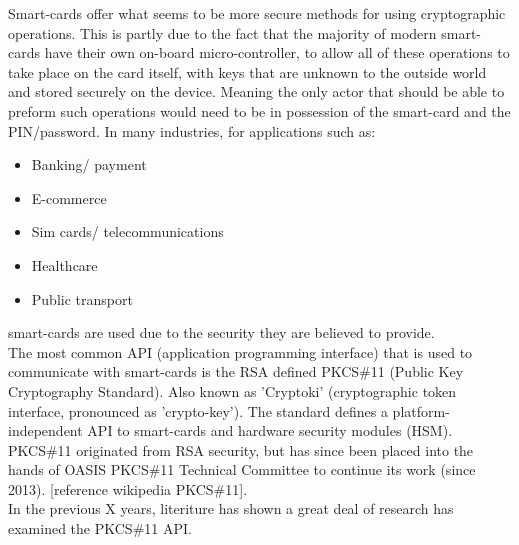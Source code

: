 \documentclass[a4paper]{report}
\begin{document}
\noindent Smart-cards offer what seems to be more secure methods for using cryptographic operations. This is partly due to the fact that the majority of modern smart-cards have their own on-board micro-controller, to allow all of these operations to take place on the card itself, with keys that are unknown to the outside world and stored securely on the device. Meaning the only actor that should be able to preform such operations would need to be in possession of the smart-card and the PIN/password. In many industries, for applications such as:
\begin{itemize}
\item Banking/ payment
\item E-commerce
\item Sim cards/ telecommunications
\item Healthcare
\item Public transport
\end{itemize}
smart-cards are used due to the security they are believed to provide.\\


\noindent The most common API (application programming interface) that is used to communicate with smart-cards is the RSA defined PKCS\#11 (Public Key Cryptography Standard). Also known as 'Cryptoki' (cryptographic token interface, pronounced as 'crypto-key'). The standard defines a platform-independent API to smart-cards and hardware security modules (HSM). PKCS\#11 originated from RSA security, but has since been placed into the hands of OASIS PKCS\#11 Technical Committee to continue its work (since 2013). [reference wikipedia PKCS\#11].\\



\noindent In the previous X years, literiture has shown a great deal of research has examined the PKCS\#11 API.


%
\end{document}
